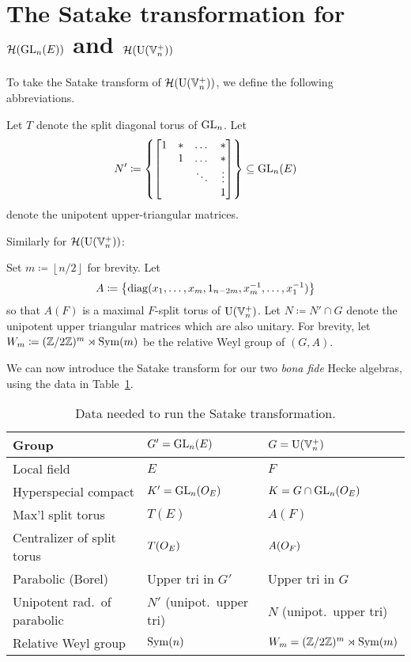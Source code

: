 \section{The Satake transformation for $\mathcal H(\operatorname{GL}_n(E))$ and $\mathcal H(\operatorname{U}(\mathbb V_n^+))$}
To take the Satake transform of $\mathcal H(\operatorname{U}(\mathbb V_n^+))$, we define the following abbreviations.
\begin{itemize}
  \ii Let $T$ denote the split diagonal torus of $\operatorname{GL}_n$.
  \ii Let
  \[ N' \coloneqq \left\{ \begin{bmatrix}
      1 & \ast & \dots & \ast \\
        & 1 & \dots & \ast \\
        &   & \ddots & \vdots \\
        &   &   & 1 \end{bmatrix}\right\} \subseteq \operatorname{GL}_n(E) \]
  denote the unipotent upper-triangular matrices.
\end{itemize}
Similarly for $\mathcal H(\operatorname{U}(\mathbb V_n^+))$:
\begin{itemize}
  \ii Set $m \coloneqq \left\lfloor n/2 \right\rfloor$ for brevity.
  \ii Let
  \[ A \coloneqq \left\{
    \operatorname{diag}(x_1, \dots, x_m, 1_{n-2m}, x_m^{-1}, \dots, x_1^{-1}) \right\} \]
  so that $A(F)$ is a maximal $F$-split torus of $\operatorname{U}(\mathbb V_n^+)$.
  \ii Let $N \coloneqq N' \cap G$ denote the unipotent upper triangular matrices
  which are also unitary.
  \ii For brevity, let $W_m \coloneqq (\mathbb Z/2\mathbb Z)^m \rtimes \operatorname{Sym}(m)$
  be the relative Weyl group of $(G,A)$.
\end{itemize}

We can now introduce the Satake transform for our two
\emph{bona fide} Hecke algebras, using the data in Table~\ref{tab:satakestuff}.

\begin{table}[ht]
  \centering
  \begin{tabular}{lll}
    \toprule
    Group & $G' = \operatorname{GL}_n(E)$ & $G = \operatorname{U}(\mathbb V_n^+)$ \\ \midrule
    Local field & $E$ & $F$ \\\hline
    Hyperspecial compact & $K' = \operatorname{GL}_n(O_E)$ & $K = G \cap \operatorname{GL}_n(O_E)$ \\\hline
    Max'l split torus & $T(E)$ & $A(F)$ \\\hline
    Centralizer of split torus & $T(O_E)$ & $A(O_F)$ \\\hline
    Parabolic (Borel) & Upper tri in $G'$ & Upper tri in $G$ \\\hline
    Unipotent rad.\ of parabolic & $N'$ (unipot.\ upper tri) & $N$ (unipot.\ upper tri) \\\hline
    Relative Weyl group & $\operatorname{Sym}(n)$ & $W_m = (\mathbb Z/2\mathbb Z)^m \rtimes \operatorname{Sym}(m)$ \\
    \bottomrule
  \end{tabular}
  \caption{Data needed to run the Satake transformation.}
  \label{tab:satakestuff}
\end{table}

